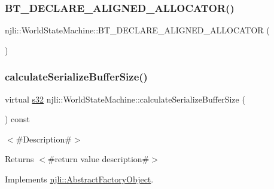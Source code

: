 \subsubsection{\texorpdfstring{B\+T\+\_\+\+D\+E\+C\+L\+A\+R\+E\+\_\+\+A\+L\+I\+G\+N\+E\+D\+\_\+\+A\+L\+L\+O\+C\+A\+T\+O\+R()}{BT\_DECLARE\_ALIGNED\_ALLOCATOR()}}
{\footnotesize\ttfamily njli\+::\+World\+State\+Machine\+::\+B\+T\+\_\+\+D\+E\+C\+L\+A\+R\+E\+\_\+\+A\+L\+I\+G\+N\+E\+D\+\_\+\+A\+L\+L\+O\+C\+A\+T\+OR (\begin{DoxyParamCaption}{ }\end{DoxyParamCaption})\hspace{0.3cm}{\ttfamily [protected]}}

\mbox{\label{classnjli_1_1_world_state_machine_a9ac2e728f8e172cf1f81dfea5870343d}} 
\subsubsection{\texorpdfstring{calculate\+Serialize\+Buffer\+Size()}{calculateSerializeBufferSize()}}
{\footnotesize\ttfamily virtual \mbox{\hyperlink{_util_8h_aa62c75d314a0d1f37f79c4b73b2292e2}{s32}} njli\+::\+World\+State\+Machine\+::calculate\+Serialize\+Buffer\+Size (\begin{DoxyParamCaption}{ }\end{DoxyParamCaption}) const\hspace{0.3cm}{\ttfamily [virtual]}}

$<$\#\+Description\#$>$

\begin{DoxyReturn}{Returns}
$<$\#return value description\#$>$ 
\end{DoxyReturn}


Implements \mbox{\hyperlink{classnjli_1_1_abstract_factory_object_a4763d05bc9dc37c559111f8bb30e1dd8}{njli\+::\+Abstract\+Factory\+Object}}.

\mbox{\label{classnjli_1_1_world_state_machine_abea6c586a4d932fcecfb18ac6aa657ca}} 

